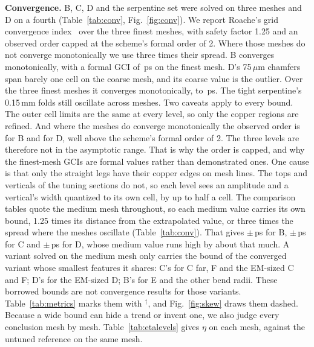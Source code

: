 \textbf{Convergence.} B, C, D and the serpentine set were solved on three meshes and D on a fourth
(Table~\ref{tab:conv}, Fig.~\ref{fig:conv}). We report Roache's grid convergence index~\cite{roache1994}
over the three finest meshes, with safety factor 1.25 and an observed order capped at the scheme's formal order
of 2. Where those meshes do not converge monotonically we use three times their spread. B converges monotonically, with a formal GCI of \GciB\,ps on the finest mesh. D's 75\,$\mu$m chamfers span barely one cell
on the coarse mesh, and its coarse value is the outlier. Over the three finest meshes it converges monotonically,
to \ExtD\,ps. The tight serpentine's 0.15\,mm folds still oscillate across meshes. Two caveats apply to every
bound. The outer cell limits are the same at every level, so only the copper regions are refined. And where the
meshes do converge monotonically the observed order is \OrderB{} for B and \OrderD{} for D, well above the
scheme's formal order of 2. The three levels are therefore not in the asymptotic range. That is why the order is capped, and why the
finest-mesh GCIs are formal values rather than demonstrated ones. One cause is that only the
straight legs have their copper edges on mesh lines. The tops and verticals of the tuning sections do not, so each level
sees an amplitude and a vertical's width quantized to its own cell, by up to half a cell. The comparison tables quote the
medium mesh throughout, so each medium value carries its own bound, 1.25 times its distance from the extrapolated
value, or three times the spread where the meshes oscillate (Table~\ref{tab:conv}). That gives $\pm$\BoundMedB\,ps for B,
$\pm$\BoundMedC\,ps for C and $\pm$\BoundMedD\,ps for D, whose medium value runs high by about that much. A
variant solved on the medium mesh only carries the bound of the converged variant whose smallest features it
shares: C's for C far, F and the EM-sized C and F; D's for the EM-sized D; B's for E and the other bend radii.
These borrowed bounds are not convergence results for those variants. Table~\ref{tab:metrics} marks them with
$^\dagger$, and Fig.~\ref{fig:skew} draws them dashed.
Because a wide bound can hide a
trend or invent one, we also judge every conclusion mesh by mesh. Table~\ref{tab:etalevels} gives $\eta$ on each mesh, against the
untuned reference on the same mesh.

\begin{table}[t]
\centering
\caption{Numerical checks (medium mesh). Truncation is how far every port voltage had fallen, relative to its
peak, over the last 5\,\% of the record.}
\label{tab:checks}
\scriptsize
{}
\end{table}

